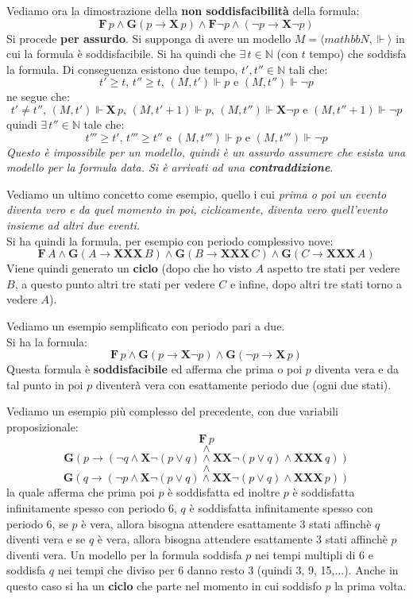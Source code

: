 \documentclass[a4paper,12pt, oneside]{book}
\begin{document}
\begin{esempio}
  Vediamo ora la dimostrazione della \textbf{non soddisfacibilità} della
  formula:
  \[\mathbf{F}\,p\land \mathbf{G}(p\to \mathbf{X}\,p)\land \mathbf{F}\neg
    p\land \mathbf{}(\neg p\to \mathbf{X}\neg p)\]
  Si procede \textbf{per assurdo}. Si supponga di avere un modello $M=\langle
  mathbb{N},\Vdash\rangle$ in cui la formula è soddisfacibile. Si ha quindi che
  $\exists\,t\in\mathbb{N}$ (con $t$ tempo) che soddisfa la formula. Di
  conseguenza esistono due tempo, $t',t''\in \mathbb{N}$ tali che:
  \[t'\geq t,\,t''\geq t,\,(M,t')\Vdash p \mbox{ e }(M,t'')\Vdash \neg p\]
  ne segue che:
  \[t'\neq t'',\,(M,t')\Vdash\mathbf{X}\,p,\,(M,t'+1)\Vdash
    p,\,(M,t'')\Vdash\mathbf{X}\neg p\mbox{ e }(M,t''+1)\Vdash \neg p\]
  quindi $\exists\,t''\in\mathbb{N}$ tale che:
  \[t'''\geq t',\,t'''\geq t''\mbox{ e }(M,t''')\Vdash p\mbox{ e
    }(M,t''')\Vdash \neg p\]
  \emph{Questo è impossibile per un modello, quindi è un assurdo assumere che
    esista una modello per la formula data. Si è arrivati ad una
    \textbf{contraddizione}}.
\end{esempio}
\newpage
Vediamo un ultimo concetto come esempio, quello i cui \textit{prima o poi un
  evento diventa vero e da quel momento in poi, ciclicamente, diventa vero
  quell'evento insieme ad altri due eventi.} \\
Si ha quindi la formula, per esempio con periodo complessivo nove:
\[\mathbf{F}\,A\land \mathbf{G}(A\to \mathbf{XXX}\,B)\land \mathbf{G}(B\to
  \mathbf{XXX}\,C)\land \mathbf{G}(C\to\mathbf{XXX}\,A)\]
Viene quindi generato un \textbf{ciclo} (dopo che ho visto $A$ aspetto tre stati
per vedere $B$, a questo punto altri tre stati per vedere $C$ e infine, dopo
altri tre stati torno a vedere $A$).
\begin{esempio}
  Vediamo un esempio semplificato con periodo pari a due.\\
  Si ha la formula:
  \[\mathbf{F}\,p\land \mathbf{G}(p\to \mathbf{X}\neg p)\land\mathbf{G}(\neg
    p\to\mathbf{X}\,p)\]
  Questa formula è \textbf{soddisfacibile} ed afferma che prima o poi $p$
  diventa vera e da tal punto in poi $p$ diventerà vera con esattamente periodo
  due (ogni due stati). 
\end{esempio}
\begin{esempio}
  Vediamo un esempio più complesso del precedente, con due variabili
  proposizionale: 
  \[\mathbf{F}\,p\]
  \[\land\]
  \[\mathbf{G}(p\to(\neg q\land \mathbf{X}\neg(p\lor q)\land
    \mathbf{XX}\neg(p\lor q)\land \mathbf{XXX}\,q))\]
  \[\land\]
  \[\mathbf{G}(q\to (\neg p\land \mathbf{X}\neg(p\lor q)\land \mathbf{XX}\neg
    (p\lor q)\land\mathbf{XXX}\,p))\] 
  la quale afferma che prima poi $p$ è soddisfatta ed inoltre $p$ è soddisfatta
  infinitamente spesso con periodo 6, $q$ è soddisfatta infinitamente spesso con
  periodo 6, se $p$ è vera, allora bisogna attendere esattamente 3 stati
  affinchè $q$ diventi vera e se $q$ è vera, allora bisogna attendere
  esattamente 3 stati affinchè $p$ diventi vera. Un modello per la formula
  soddisfa $p$ nei tempi multipli di 6 e soddisfa $q$ nei tempi che diviso per 6
  danno resto 3 (quindi 3, 9, 15,$\ldots$). Anche in questo caso si ha un
  \textbf{ciclo} che parte nel momento in cui soddisfo $p$ la prima volta.
\end{esempio}
\newpage
\end{document}
